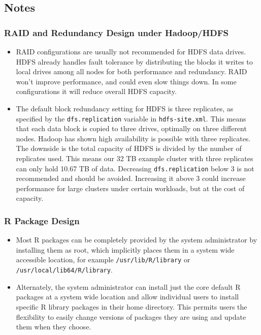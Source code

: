 \subsection{Notes}

\subsubsection{RAID and Redundancy Design under Hadoop/HDFS}
\begin{itemize}
\item RAID configurations are usually not recommended for HDFS data drives.
HDFS already handles fault tolerance by distributing the blocks it writes
to local drives among all nodes for both performance and redundancy.
RAID won't improve performance, and could even slow things down.
In some configurations it will reduce overall HDFS capacity.
\item The default block redundancy setting for HDFS is
three replicates, as specified by the \verb|dfs.replication| variable
in \verb|hdfs-site.xml|. This means that each data block is copied to
three drives, optimally on three different nodes. Hadoop has shown high
availability is possible with three replicates.  The downside is the total
capacity of HDFS is divided by the number of replicates used.  This means
our 32 TB example cluster with three replicates can only hold 10.67 TB
of data.  Decreasing \verb|dfs.replication| below 3 is not recommended
and should be avoided.  Increasing it above 3 could increase performance for
large clusters under certain workloads, but at the cost of capacity.
\end{itemize}

\subsubsection{R Package Design}
\begin{itemize}
\item Most R packages can be completely provided by the system
administrator by installing them as root, which implicitly places them in
a system wide accessible location, for example \verb|/usr/lib/R/library|
or \verb|/usr/local/lib64/R/library|.
\item Alternately, the system administrator can install just the core
default R packages at a system wide location and allow individual
users to install specific R library packages in their home directory.
This permits users the flexibility to easily change versions of packages
they are using and update them when they choose.
\end{itemize} 

